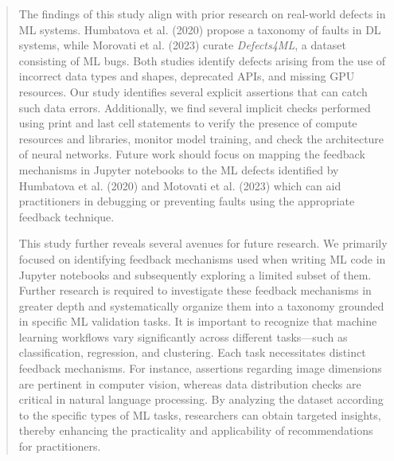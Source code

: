 \documentclass[11pt,fleqn]{article}
\begin{document}
\begin{quote}
  The findings of this study align with prior research on real-world defects in ML systems. Humbatova et al. (2020) propose a taxonomy of faults in DL systems, while Morovati et al. (2023) curate \emph{Defects4ML}, a dataset consisting of ML bugs. Both studies identify defects arising from the use of incorrect data types and shapes, deprecated APIs, and missing GPU resources. Our study identifies several explicit assertions that can catch such data errors. Additionally, we find several implicit checks performed using print and last cell statements to verify the presence of compute resources and libraries, monitor model training, and check the architecture of neural networks. Future work should focus on mapping the feedback mechanisms in Jupyter notebooks to the ML defects identified by Humbatova et al. (2020) and Motovati et al. (2023) which can aid practitioners in debugging or preventing faults using the appropriate feedback technique.

  This study further reveals several avenues for future research. We primarily focused on identifying feedback mechanisms used when writing ML code in Jupyter notebooks and subsequently exploring a limited subset of them. Further research is required to investigate these feedback mechanisms in greater depth and systematically organize them into a taxonomy grounded in specific ML validation tasks. It is important to recognize that machine learning workflows vary significantly across different tasks---such as classification, regression, and clustering. Each task necessitates distinct feedback mechanisms. For instance, assertions regarding image dimensions are pertinent in computer vision, whereas data distribution checks are critical in natural language processing. By analyzing the dataset according to the specific types of ML tasks, researchers can obtain targeted insights, thereby enhancing the practicality and applicability of recommendations for practitioners.

\end{quote}
\end{document}
